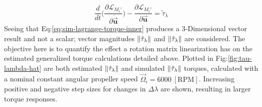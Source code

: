 \begin{equation}\label{eq:sim-lagrange-torque-inner}
\frac{d}{dt}\bigg(\frac{\partial\mathcal{L}_{M_i'}}{\partial\dot{\vec{\mathbf{u}}}}\bigg)-\frac{\partial\mathcal{L}_{M_i'}}{\partial\vec{\mathbf{u}}}=\widetilde{\tau}_\lambda
\end{equation}
Seeing that Eq:\ref{eq:sim-lagrange-torque-inner} produces a 3-Dimensional vector result and not a scalar; vector magnitudes $\left\lVert\hat{\tau}_\lambda\right\rVert$ and $\left\lVert\tilde{\tau}_\lambda\right\rVert$ are considered. The objective here is to quantify the effect a rotation matrix linearization has on the estimated generalized torque calculations detailed above. Plotted in Fig:\ref{fig:tau-lambda-hat} are both estimated $\left\lVert\hat{\tau}_\lambda\right\rVert$ and simulated $\left\lVert\tilde{\tau}_\lambda\right\rVert$ torques, calculated with a nominal constant angular propeller speed $\vec{\Omega}_i=6000~[\text{RPM}]$. Increasing positive and negative step sizes for changes in $\Delta\lambda$ are shown, resulting in larger torque responses.  
